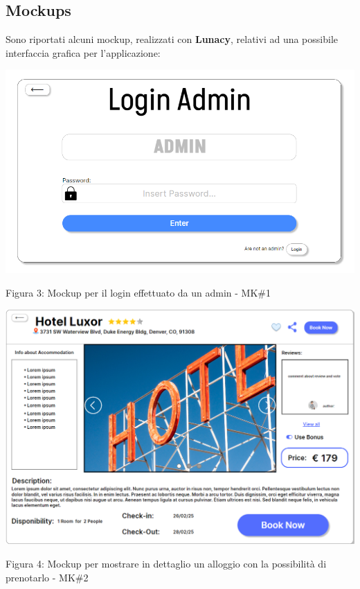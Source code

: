 \documentclass[10pt]{article}
\begin{document}
\subsection{Mockups}
Sono riportati alcuni mockup, realizzati con \textbf{Lunacy}, relativi ad una possibile interfaccia grafica per l'applicazione:
\begin{center}
\includegraphics[scale=0.6]{Mockup/MockupAdminLogin}
\label{mk1}
\par\medskip
Figura 3: Mockup per il login effettuato da un admin - MK\#1 
\par\medskip
\par\medskip
{}
\includegraphics[scale=0.5]{Mockup/mockupBooking}
\label{mk2}
\par\medskip
\par\medskip
Figura 4: Mockup per mostrare in dettaglio un alloggio con la possibilità di prenotarlo - MK\#2
\par\medskip
{}

\end{center}
\end{document}

